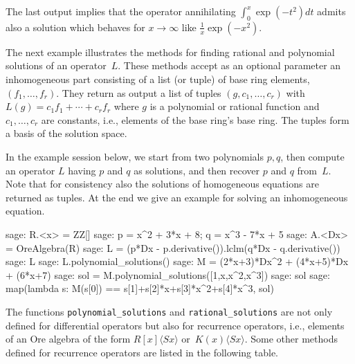 \documentclass[11pt]{amsart}
\def\<#1>{\langle#1\rangle}
\begin{document}
The last output implies that the operator annihilating $\int_0^x \exp(-t^2) dt$
admits also a solution which behaves for $x\to\infty$ like $\frac1x\exp(-x^2)$.


The next example illustrates the methods for finding rational and polynomial
solutions of an operator~$L$.  These methods accept as an optional parameter an
inhomogeneous part consisting of a list (or tuple) of base ring elements,
$(f_1,\dots,f_r)$. They return as output a list of tuples $(g,c_1,\dots,c_r)$
with $L(g)=c_1f_1+\cdots+c_rf_r$ where $g$ is a polynomial or rational function
and $c_1,\dots,c_r$ are constants, i.e., elements of the base ring's base
ring. The tuples form a basis of the solution space.

In the example session below, we start from two polynomials $p,q$, then compute an 
operator $L$ having $p$ and $q$ as solutions, and then recover $p$ and $q$ from~$L$.
Note that for consistency also the solutions of homogeneous equations are returned as 
tuples. At the end we give an example for solving an inhomogeneous equation.

\begin{sageexample}
  sage: R.<x> = ZZ[]
  sage: p = x^2 + 3*x + 8; q = x^3 - 7*x + 5
  sage: A.<Dx> = OreAlgebra(R)
  sage: L = (p*Dx - p.derivative()).lclm(q*Dx - q.derivative())
  sage: L
  sage: L.polynomial_solutions()
  sage: M = (2*x+3)*Dx^2 + (4*x+5)*Dx + (6*x+7)
  sage: sol = M.polynomial_solutions([1,x,x^2,x^3])
  sage: sol
  sage: map(lambda s: M(s[0]) == s[1]+s[2]*x+s[3]*x^2+s[4]*x^3, sol)
\end{sageexample}

The functions \verb|polynomial_solutions| and \verb|rational_solutions| are not
only defined for differential operators but also for recurrence operators, i.e.,
elements of an Ore algebra of the form $R[x]\<Sx>$ or~$K(x)\<Sx>$. Some other
methods defined for recurrence operators are listed in the following table. 
\end{document}
